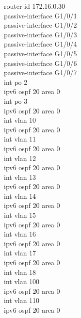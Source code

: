 \documentclass[12pt,a4paper]{report}
\begin{document}
\begin{itemize}
\begin{itemize}
\begin{itemize}
{router-id 172.16.0.30\\
passive-interface G1/0/1\\
passive-interface G1/0/2\\
passive-interface G1/0/3\\
passive-interface G1/0/4\\
passive-interface G1/0/5\\
passive-interface G1/0/6\\
passive-interface G1/0/7\\
int po 2\\
ipv6 ospf 20 area 0\\
int po 3\\
ipv6 ospf 20 area 0\\
int vlan 10\\
ipv6 ospf 20 area 0\\
int vlan 11\\
ipv6 ospf 20 area 0\\
int vlan 12\\
ipv6 ospf 20 area 0\\
int vlan 13\\
ipv6 ospf 20 area 0\\
int vlan 14\\
ipv6 ospf 20 area 0\\
int vlan 15\\
ipv6 ospf 20 area 0\\
int vlan 16\\
ipv6 ospf 20 area 0 \\
int vlan 17\\
ipv6 ospf 20 area 0\\
int vlan 18\\
int vlan 100\\
ipv6 ospf 20 area 0\\
int vlan 110\\
ipv6 ospf 20 area 0\\}
        
          \end{itemize}
       \end{itemize}
      
\end{itemize}
\end{document}
